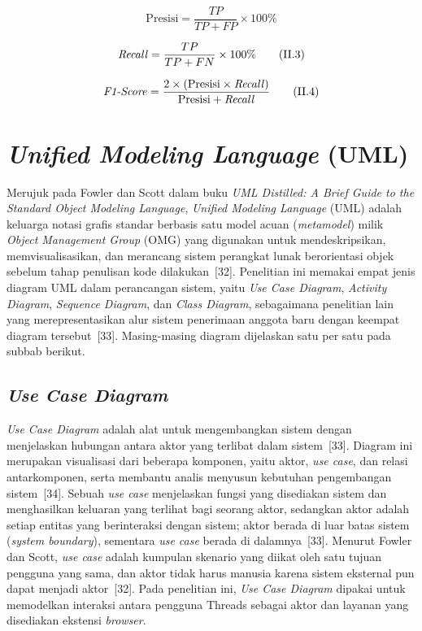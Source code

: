 \documentclass[12pt,a4paper,twoside]{report}
\begin{document}
\begin{equation}
  \text{Presisi} = \frac{TP}{TP + FP} \times 100\%
  \tag{II.2}
\end{equation}

\begin{equation}
  \text{\textit{Recall}} = \frac{TP}{TP + FN} \times 100\%
  \tag{II.3}
\end{equation}

\begin{equation}
  \text{\textit{F1-Score}} = \frac{2 \times (\text{Presisi} \times \text{\textit{Recall}})}{\text{Presisi} + \text{\textit{Recall}}}
  \tag{II.4}
\end{equation}

\section{\textit{Unified Modeling Language} (UML)}

Merujuk pada Fowler dan Scott dalam buku \textit{UML Distilled: A Brief Guide to the Standard Object Modeling Language}, \textit{Unified Modeling Language} (UML) adalah keluarga notasi grafis standar berbasis satu model acuan (\textit{metamodel}) milik \textit{Object Management Group} (OMG) yang digunakan untuk mendeskripsikan, memvisualisasikan, dan merancang sistem perangkat lunak berorientasi objek sebelum tahap penulisan kode dilakukan~[32]. Penelitian ini memakai empat jenis diagram UML dalam perancangan sistem, yaitu \textit{Use Case Diagram}, \textit{Activity Diagram}, \textit{Sequence Diagram}, dan \textit{Class Diagram}, sebagaimana penelitian lain yang merepresentasikan alur sistem penerimaan anggota baru dengan keempat diagram tersebut~[33]. Masing-masing diagram dijelaskan satu per satu pada subbab berikut.

\subsection{\textit{Use Case Diagram}}

\textit{Use Case Diagram} adalah alat untuk mengembangkan sistem dengan menjelaskan hubungan antara aktor yang terlibat dalam sistem~[33]. Diagram ini merupakan visualisasi dari beberapa komponen, yaitu aktor, \textit{use case}, dan relasi antarkomponen, serta membantu analis menyusun kebutuhan pengembangan sistem~[34]. Sebuah \textit{use case} menjelaskan fungsi yang disediakan sistem dan menghasilkan keluaran yang terlihat bagi seorang aktor, sedangkan aktor adalah setiap entitas yang berinteraksi dengan sistem; aktor berada di luar batas sistem (\textit{system boundary}), sementara \textit{use case} berada di dalamnya~[33]. Menurut Fowler dan Scott, \textit{use case} adalah kumpulan skenario yang diikat oleh satu tujuan pengguna yang sama, dan aktor tidak harus manusia karena sistem eksternal pun dapat menjadi aktor~[32]. Pada penelitian ini, \textit{Use Case Diagram} dipakai untuk memodelkan interaksi antara pengguna Threads sebagai aktor dan layanan yang disediakan ekstensi \textit{browser}.
\end{document}
